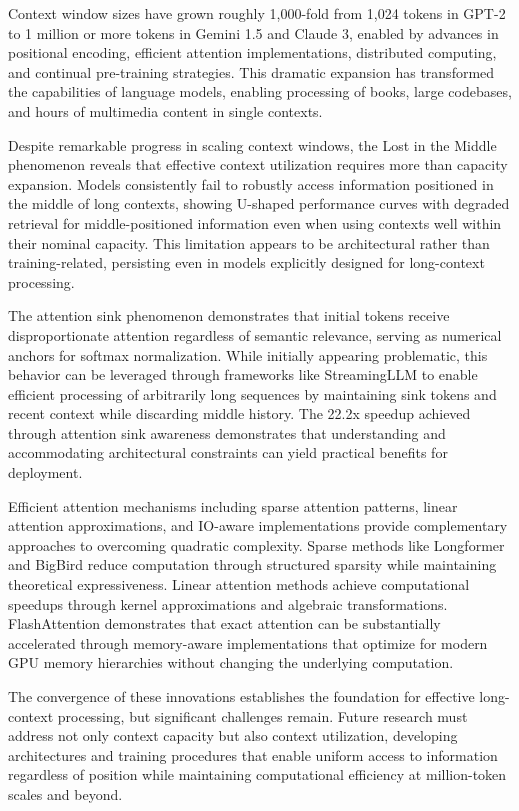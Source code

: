 Context window sizes have grown roughly 1,000-fold from 1,024 tokens in GPT-2 to 1 million or more tokens in Gemini 1.5 and Claude 3, enabled by advances in positional encoding, efficient attention implementations, distributed computing, and continual pre-training strategies. This dramatic expansion has transformed the capabilities of language models, enabling processing of books, large codebases, and hours of multimedia content in single contexts.

Despite remarkable progress in scaling context windows, the Lost in the Middle phenomenon reveals that effective context utilization requires more than capacity expansion. Models consistently fail to robustly access information positioned in the middle of long contexts, showing U-shaped performance curves with degraded retrieval for middle-positioned information even when using contexts well within their nominal capacity. This limitation appears to be architectural rather than training-related, persisting even in models explicitly designed for long-context processing.

The attention sink phenomenon demonstrates that initial tokens receive disproportionate attention regardless of semantic relevance, serving as numerical anchors for softmax normalization. While initially appearing problematic, this behavior can be leveraged through frameworks like StreamingLLM to enable efficient processing of arbitrarily long sequences by maintaining sink tokens and recent context while discarding middle history. The 22.2x speedup achieved through attention sink awareness demonstrates that understanding and accommodating architectural constraints can yield practical benefits for deployment.

Efficient attention mechanisms including sparse attention patterns, linear attention approximations, and IO-aware implementations provide complementary approaches to overcoming quadratic complexity. Sparse methods like Longformer and BigBird reduce computation through structured sparsity while maintaining theoretical expressiveness. Linear attention methods achieve computational speedups through kernel approximations and algebraic transformations. FlashAttention demonstrates that exact attention can be substantially accelerated through memory-aware implementations that optimize for modern GPU memory hierarchies without changing the underlying computation.

The convergence of these innovations establishes the foundation for effective long-context processing, but significant challenges remain. Future research must address not only context capacity but also context utilization, developing architectures and training procedures that enable uniform access to information regardless of position while maintaining computational efficiency at million-token scales and beyond.
